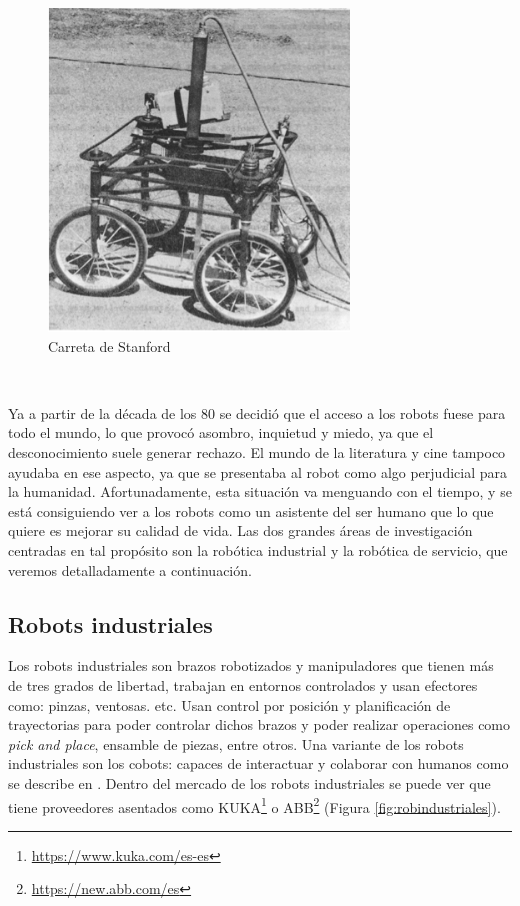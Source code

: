 \begin{figure} [h!]
	\begin{center}
		\includegraphics[width=8cm]{figs/stanford.png}
	\end{center}
	\caption{Carreta de Stanford}
	\label{fig:stanford}
\end{figure}\


Ya a partir de la década de los 80 se decidió que el acceso a los robots fuese para todo el mundo, lo que provocó asombro, inquietud y miedo, ya que el desconocimiento suele generar rechazo. El mundo de la literatura y cine tampoco ayudaba en ese aspecto, ya que se presentaba al robot como algo perjudicial para la humanidad. Afortunadamente, esta situación va menguando con el tiempo, y se está consiguiendo ver a los robots como un asistente del ser humano que lo que quiere es mejorar su calidad de vida. Las dos grandes áreas de investigación centradas en tal propósito son la robótica industrial y la robótica de servicio, que veremos detalladamente a continuación.


\subsection{Robots industriales}

Los robots industriales son brazos robotizados y manipuladores que tienen más de tres grados de libertad, trabajan en entornos controlados y usan efectores como: pinzas, ventosas. etc. Usan control por posición y planificación de trayectorias para poder controlar dichos brazos y poder realizar operaciones como \textit{pick and place}, ensamble de piezas, entre otros. Una variante de los robots industriales son los cobots: capaces de interactuar y colaborar con humanos como se describe en  \cite{ELZAATARI2019162}. Dentro del mercado de los robots industriales se puede ver que tiene proveedores asentados como \acs{KUKA}\footnote{\url{https://www.kuka.com/es-es}} o \acs{ABB}\footnote{\url{https://new.abb.com/es}} (Figura \ref{fig:robindustriales}).



